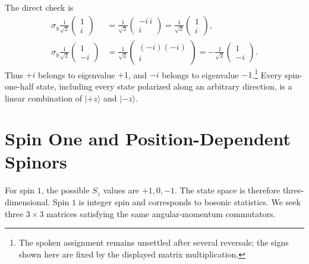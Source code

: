 \begin{classroomqa}
\end{classroomqa}

The direct check is
\begin{align}
\sigma_y\frac{1}{\sqrt2}
\begin{pmatrix}
1\\
i
\end{pmatrix}
&=
\frac{1}{\sqrt2}
\begin{pmatrix}
-i\,i\\
i
\end{pmatrix}
=
\frac{1}{\sqrt2}
\begin{pmatrix}
1\\
i
\end{pmatrix},\\
\sigma_y\frac{1}{\sqrt2}
\begin{pmatrix}
1\\
-i
\end{pmatrix}
&=
\frac{1}{\sqrt2}
\begin{pmatrix}
(-i)(-i)\\
i
\end{pmatrix}
=
-\frac{1}{\sqrt2}
\begin{pmatrix}
1\\
-i
\end{pmatrix}.
\end{align}
Thus \(+i\) belongs to eigenvalue \(+1\), and \(-i\) belongs to eigenvalue \(-1\).\footnote{The spoken assignment remains unsettled after several reversals; the signs shown here are fixed by the displayed matrix multiplication.} Every spin-one-half state, including every state polarized along an arbitrary direction, is a linear combination of \(|+z\rangle\) and \(|-z\rangle\).

\section{Spin One and Position-Dependent Spinors}

For spin \(1\), the possible \(S_z\) values are \(+1,0,-1\). The state space is therefore three-dimensional. Spin \(1\) is integer spin and corresponds to bosonic statistics. We seek three \(3\times3\) matrices satisfying the same angular-momentum commutators.

